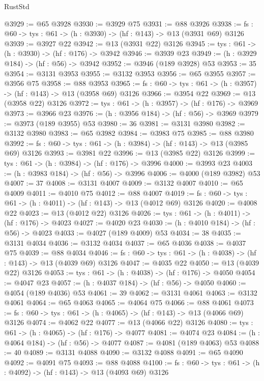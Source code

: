 \begin{lexlean}{RustStd}
\begin{coremodule}
@3929 := @65 @3928
@3930 := @3929 @75
@3931 := @88 @3926
@3938 := {fs : @60} -> {tys : @61} -> (h : @3930) -> (hf : @143) -> @13 (@3931 @69) @3126
@3939 := @3927 @22
@3942 := @13 (@3931 @22) @3126
@3945 := {tys : @61} -> (h : @3930) -> (hf : @176) -> @3942
@3946 := @3939 @23
@3949 := (h : @3929 @184) -> (hf : @56) -> @3942
@3952 := @3946 (@189 @3928) @53
@3953 := 35
@3954 := @3131 @3953
@3955 := @3132 @3953
@3956 := @65 @3955
@3957 := @3956 @75
@3958 := @88 @3953
@3965 := {fs : @60} -> {tys : @61} -> (h : @3957) -> (hf : @143) -> @13 (@3958 @69) @3126
@3966 := @3954 @22
@3969 := @13 (@3958 @22) @3126
@3972 := {tys : @61} -> (h : @3957) -> (hf : @176) -> @3969
@3973 := @3966 @23
@3976 := (h : @3956 @184) -> (hf : @56) -> @3969
@3979 := @3973 (@189 @3955) @53
@3980 := 36
@3981 := @3131 @3980
@3982 := @3132 @3980
@3983 := @65 @3982
@3984 := @3983 @75
@3985 := @88 @3980
@3992 := {fs : @60} -> {tys : @61} -> (h : @3984) -> (hf : @143) -> @13 (@3985 @69) @3126
@3993 := @3981 @22
@3996 := @13 (@3985 @22) @3126
@3999 := {tys : @61} -> (h : @3984) -> (hf : @176) -> @3996
@4000 := @3993 @23
@4003 := (h : @3983 @184) -> (hf : @56) -> @3996
@4006 := @4000 (@189 @3982) @53
@4007 := 37
@4008 := @3131 @4007
@4009 := @3132 @4007
@4010 := @65 @4009
@4011 := @4010 @75
@4012 := @88 @4007
@4019 := {fs : @60} -> {tys : @61} -> (h : @4011) -> (hf : @143) -> @13 (@4012 @69) @3126
@4020 := @4008 @22
@4023 := @13 (@4012 @22) @3126
@4026 := {tys : @61} -> (h : @4011) -> (hf : @176) -> @4023
@4027 := @4020 @23
@4030 := (h : @4010 @184) -> (hf : @56) -> @4023
@4033 := @4027 (@189 @4009) @53
@4034 := 38
@4035 := @3131 @4034
@4036 := @3132 @4034
@4037 := @65 @4036
@4038 := @4037 @75
@4039 := @88 @4034
@4046 := {fs : @60} -> {tys : @61} -> (h : @4038) -> (hf : @143) -> @13 (@4039 @69) @3126
@4047 := @4035 @22
@4050 := @13 (@4039 @22) @3126
@4053 := {tys : @61} -> (h : @4038) -> (hf : @176) -> @4050
@4054 := @4047 @23
@4057 := (h : @4037 @184) -> (hf : @56) -> @4050
@4060 := @4054 (@189 @4036) @53
@4061 := 39
@4062 := @3131 @4061
@4063 := @3132 @4061
@4064 := @65 @4063
@4065 := @4064 @75
@4066 := @88 @4061
@4073 := {fs : @60} -> {tys : @61} -> (h : @4065) -> (hf : @143) -> @13 (@4066 @69) @3126
@4074 := @4062 @22
@4077 := @13 (@4066 @22) @3126
@4080 := {tys : @61} -> (h : @4065) -> (hf : @176) -> @4077
@4081 := @4074 @23
@4084 := (h : @4064 @184) -> (hf : @56) -> @4077
@4087 := @4081 (@189 @4063) @53
@4088 := 40
@4089 := @3131 @4088
@4090 := @3132 @4088
@4091 := @65 @4090
@4092 := @4091 @75
@4093 := @88 @4088
@4100 := {fs : @60} -> {tys : @61} -> (h : @4092) -> (hf : @143) -> @13 (@4093 @69) @3126

\end{coremodule}
\end{lexlean}
